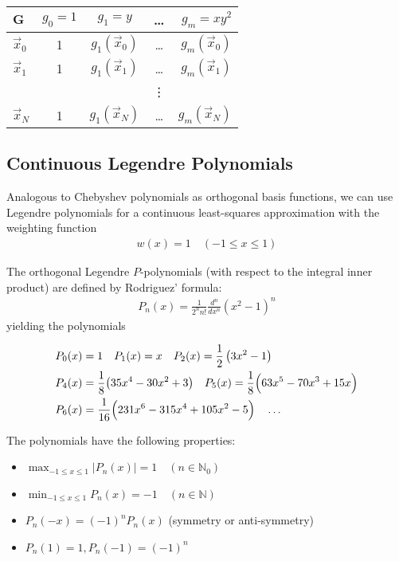 \begin{center}
    \begin{tabular}{l|cccr}
        $\mathbf{G}$ & $g_0 = 1$ & $g_1 = y$        & \ldots & $g_m=xy^2$       \\
        \hline
        $\vec{x}_0$  & 1         & $g_1(\vec{x}_0)$ & \ldots & $g_m(\vec{x}_0)$ \\
        $\vec{x}_1$  & 1         & $g_1(\vec{x}_1)$ & \ldots & $g_m(\vec{x}_1)$ \\
                     &           &                  & \vdots &                  \\
        $\vec{x}_N$  & 1         & $g_1(\vec{x}_N)$ & \ldots & $g_m(\vec{x}_N)$ \\
    \end{tabular}
\end{center}

\subsection{Continuous Legendre Polynomials}

Analogous to Chebyshev polynomials as orthogonal basis functions, we can use Legendre polynomials for a
continuous least-squares approximation with the weighting function
\begin{align*}
    w(x)=1\quad(-1\leq x\leq 1)
\end{align*}

The orthogonal Legendre $P$-polynomials (with respect to the integral inner product) are defined by Rodriguez' formula:
\begin{align*}
    P_n(x)=\frac{1}{2^nn!}\frac{d^n}{dx^n}\left(x^2-1\right)^n
\end{align*}
yielding the polynomials
\begin{snugshade*}
    \begin{align*}
        & P_0(x) = 1 \quad P_1(x) = x \quad P_2(x) = \frac{1}{2}\left(3x^2-1\right) \\
        & P_4(x) = {\frac{1}{8}}{\big(}35x^{4}-30x^{2}+3{\big)}\quad P_{5}(x)={\frac{1}{8}}{\Big(}63x^{5}-70x^{3}+15x{\Big)} \\
        & P_{6}(x)={\frac{1}{16}}\Bigl(231x^{6}-315x^{4}+105x^{2}-5\Bigr)\quad \ldots
    \end{align*}
\end{snugshade*}

The polynomials have the following properties:
\begin{itemize}
    \item $\displaystyle\max_{-1\leq x\leq 1}|P_{n}(x)|=1\quad(n\in \mathbb{N}_0)$
    \item $\displaystyle\min_{-1\leq x\leq 1} P_n(x) = -1\quad(n\in\mathbb{N})$
    \item $P_n(-x) = (-1)^nP_n(x)$ (symmetry or anti-symmetry)
    \item $P_n(1) = 1, P_n(-1) = (-1)^n$
\end{itemize}

